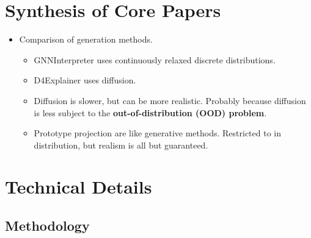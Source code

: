 \documentclass[
  11pt,
  letterpaper,
]{article}
\providecommand{\tightlist}{%
  \setlength{\itemsep}{0pt}\setlength{\parskip}{0pt}}\usepackage{longtable,booktabs,array}
\begin{document}
\hypertarget{synthesis-of-core-papers}{%
\section{Synthesis of Core Papers}\label{synthesis-of-core-papers}}

\begin{itemize}
\tightlist
\item
  Comparison of generation methods.

  \begin{itemize}
  \tightlist
  \item
    GNNInterpreter uses continuously relaxed discrete distributions.
  \item
    D4Explainer uses diffusion.
  \item
    Diffusion is slower, but can be more realistic. Probably because
    diffusion is less subject to the \textbf{out-of-distribution (OOD)
    problem}.
  \item
    Prototype projection are like generative methods. Restricted to in
    distribution, but realism is all but guaranteed.
  \end{itemize}
\end{itemize}

\hypertarget{technical-details}{%
\section{Technical Details}\label{technical-details}}

\hypertarget{methodology}{%
\subsection{Methodology}\label{methodology}}
\end{document}
